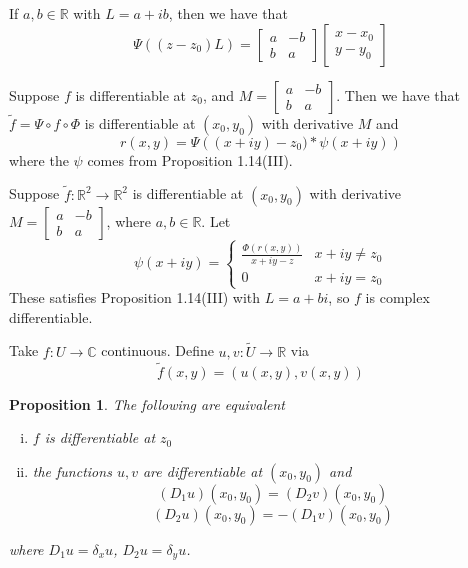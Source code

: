 \documentclass[11pt]{article}
\theoremstyle{plain}
\newtheorem{proposition}[theorem]{Proposition}
\theoremstyle{definition}
\begin{document}
\vspace{5mm}
\noindent
If $a, b \in \mathbb{R}$ with $L = a+ ib$, then we have that 
$$ \Psi((z - z_0)L) = \begin{bmatrix} a & -b \\ b & a \end{bmatrix} \begin{bmatrix} x- x_0 \\ y - y_0 \end{bmatrix} $$

\vspace{5mm}
\noindent
Suppose $f$ is differentiable at $z_0$, and $M = \begin{bmatrix} a & -b \\ b & a \end{bmatrix}$. Then we have that $\tilde{f} = \Psi \circ f \circ \Phi$ is differentiable at $(x_0, y_0)$ with derivative $M$ and 
$$r(x, y) = \Psi\left((x + iy) - z_0) * \psi(x + iy)\right)$$
where the $\psi$ comes from Proposition 1.14(III).

\vspace{5mm}
\noindent
Suppose $\tilde{f}: \mathbb{R}^{2} \to \mathbb{R}^{2}$ is differentiable at $(x_0, y_0)$ with derivative \\$M = \begin{bmatrix} a & -b \\ b & a \end{bmatrix}$, where $a, b \in \mathbb{R}$. Let 
$$ \psi(x + iy) = \begin{cases} 
\frac{\Phi(r(x, y))}{x + iy - z} & x +iy \neq z_0 \\
0 & x + iy = z_0 
\end{cases} 
$$
These satisfies Proposition 1.14(III) with $L = a + bi$, so $f$ is complex differentiable.

\vspace{5mm}
\noindent
Take $f: U \to \mathbb{C}$ continuous. Define $u, v: \tilde{U} \to \mathbb{R}$ via 
$$\tilde{f}(x,y) = (u(x, y), v(x, y)) $$

\begin{proposition}
The following are equivalent
\begin{enumerate}[(i)]
\item $f$ is differentiable at $z_0$
\item the functions $u,v$ are differentiable at $(x_0, y_0)$ and 
$$ (D_1 u)(x_0, y_0) = (D_2 v)(x_0, y_0) $$
$$ (D_2 u)(x_0, y_0) = -(D_1 v)(x_0, y_0) $$
\end{enumerate}
where $D_1 u = \delta_x u$, $D_2 u = \delta_y u$.
\end{proposition}
\end{document}
